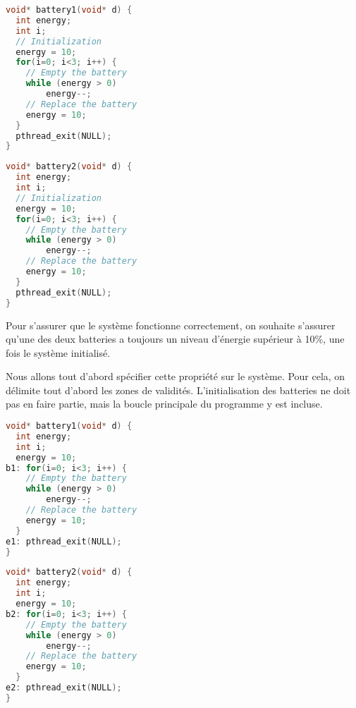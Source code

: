\noindent\begin{minipage}{.45\textwidth}
\begin{lstlisting}[language=C, frame=single, caption=Thread 1]
void* battery1(void* d) {
  int energy;
  int i;
  // Initialization
  energy = 10;
  for(i=0; i<3; i++) {
    // Empty the battery
    while (energy > 0)
        energy--;
    // Replace the battery
    energy = 10;
  }
  pthread_exit(NULL);
}
\end{lstlisting}
\end{minipage}\hfill
\begin{minipage}{.45\textwidth}
\begin{lstlisting}[language=C, frame=single, caption=Thread 2]
void* battery2(void* d) {
  int energy;
  int i;
  // Initialization
  energy = 10;
  for(i=0; i<3; i++) {
    // Empty the battery
    while (energy > 0)
        energy--;
    // Replace the battery
    energy = 10;
  }
  pthread_exit(NULL);
}
\end{lstlisting}
\end{minipage}

Pour s'assurer que le système fonctionne correctement, on souhaite s'assurer qu’une des deux batteries a toujours un niveau d'énergie supérieur à 10\%, une fois
le système initialisé.

Nous allons tout d'abord spécifier cette propriété sur le système. Pour cela, on
délimite tout d'abord les zones de validités. L'initialisation des batteries ne
doit pas en faire partie, mais la boucle principale du programme y est incluse.

\noindent\begin{minipage}{.45\textwidth}
\begin{lstlisting}[language=C, frame=single, caption=Thread 1 avec labels]
void* battery1(void* d) {
  int energy;
  int i;
  energy = 10;
b1: for(i=0; i<3; i++) {
    // Empty the battery
    while (energy > 0)
        energy--;
    // Replace the battery
    energy = 10;
  }
e1: pthread_exit(NULL);
}
\end{lstlisting}
\end{minipage}\hfill
\begin{minipage}{.45\textwidth}
\begin{lstlisting}[language=C, frame=single, caption=Thread 2 avec labels]
void* battery2(void* d) {
  int energy;
  int i;
  energy = 10;
b2: for(i=0; i<3; i++) {
    // Empty the battery
    while (energy > 0)
        energy--;
    // Replace the battery
    energy = 10;
  }
e2: pthread_exit(NULL);
}
\end{lstlisting}
\end{minipage}

